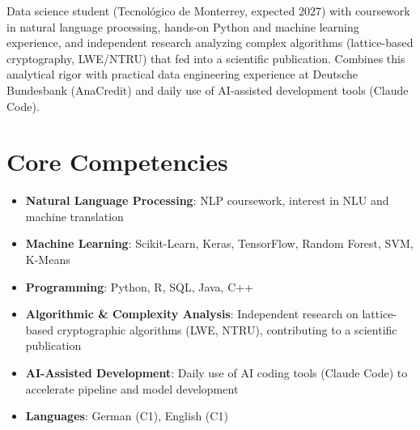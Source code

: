 \documentclass[11pt,a4paper,sans]{moderncv}
\begin{document}
\makecvtitle


\vspace{6pt}
\small{Data science student (Tecnológico de Monterrey, expected 2027) with coursework in natural language processing, hands-on Python and machine learning experience, and independent research analyzing complex algorithms (lattice-based cryptography, LWE/NTRU) that fed into a scientific publication. Combines this analytical rigor with practical data engineering experience at Deutsche Bundesbank (AnaCredit) and daily use of AI-assisted development tools (Claude Code).}


\section{Core Competencies}
\vspace{1pt}
\begin{itemize}

\item \textbf{Natural Language Processing}: NLP coursework, interest in NLU and machine translation

\item \textbf{Machine Learning}: Scikit-Learn, Keras, TensorFlow, Random Forest, SVM, K-Means

\item \textbf{Programming}: Python, R, SQL, Java, C++

\item \textbf{Algorithmic \& Complexity Analysis}: Independent research on lattice-based cryptographic algorithms (LWE, NTRU), contributing to a scientific publication

\item \textbf{AI-Assisted Development}: Daily use of AI coding tools (Claude Code) to accelerate pipeline and model development

\item \textbf{Languages}: German (C1), English (C1)

\end{itemize}

\end{document}
